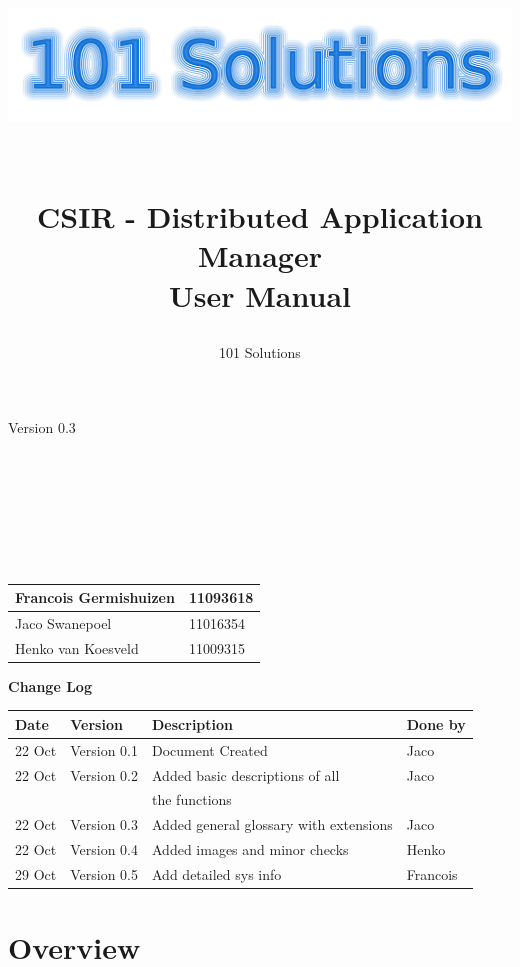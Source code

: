 \documentclass[a4paper,12pt,final]{article}
\title{
\begin{center}
  	\includegraphics[scale=0.3]{101Logo.png} 
  \end{center}
  \textbf{\\}
CSIR - Distributed Application Manager\\
User Manual\\
}
\author{101 Solutions}
\begin{document}
\maketitle
\begin{center}
Version 0.3
\end{center}
\textbf{\\}
\textbf{\\}
\textbf{\\}
\textbf{\\}
\textbf{\\}
\textbf{\\}
\begin{center}
\begin{tabular}{|l|l|}
\hline
Francois Germishuizen & 11093618\\
\hline
Jaco Swanepoel & 11016354\\
\hline
Henko van Koesveld & 11009315\\
\hline
\end{tabular}
\end{center}
\thispagestyle{empty}
\newpage
\thispagestyle{empty}
\textbf{\large{Change Log}}
\vspace{6pt}\newline
\begin{tabular}{|l|l|l|l|}
\hline
\textbf{Date} & \textbf{Version} & \textbf{Description} & \textbf{Done by}\\
\hline
22 Oct & Version 0.1 & Document Created & Jaco\\
\hline
22 Oct & Version 0.2 & Added basic descriptions of all  & Jaco\\
&&the functions&\\
\hline
22 Oct & Version 0.3 & Added general glossary with extensions & Jaco\\
\hline
22 Oct & Version 0.4 & Added images and minor checks  & Henko\\
\hline
29 Oct & Version 0.5 & Add detailed sys info  & Francois\\
\hline
\end{tabular}
\newpage
\tableofcontents
\thispagestyle{empty}
\newpage

\section{Overview}
\end{document}
